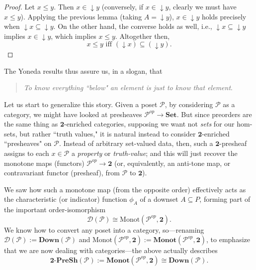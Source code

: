 \documentclass[a4paper]{book}
\theoremstyle{definition}
\theoremstyle{definition}
\theoremstyle{definition}
\theoremstyle{theorem}
\theoremstyle{definition}
\begin{document}
\begin{proof}
	Let $x \leq y$. Then $x \in \downarrow y$ (conversely, if $x \in \downarrow y$, clearly we must have $x \leq y$). Applying the previous lemma (taking $A = \downarrow y$), $x \in \downarrow y$ holds precisely when $\downarrow x \subseteq  \downarrow y$. On the other hand, the converse holds as well, i.e., $\downarrow x \subseteq  \downarrow y$ implies $x \in \downarrow y$, which implies $x \leq y$. Altogether then, 
	\begin{equation}
	x \leq y \text{ iff } (\downarrow x) \subseteq  (\downarrow y ). 
	\end{equation}
\end{proof} \noindent 
The Yoneda results thus assure us, in a slogan, that 
\begin{quote}
	\textit{To know everything ``below" an element is just to know that element}. 
\end{quote}
Let us start to generalize this story. Given a poset $\mathcal{P}$, by considering $\mathcal{P}$ as a category, we might have looked at presheaves $\mathcal{P}^{op} \rightarrow \textbf{Set}$. But since preorders are the same thing as $\textbf{2}$-enriched categories, supposing we want not \textit{sets} for our hom-sets, but rather ``truth values," it is natural instead to consider $\textbf{2}$-enriched ``presheaves" on $\mathcal{P}$. Instead of arbitrary set-valued data, then, such a $\textbf{2}$-presheaf assigns to each $x \in \mathcal{P}$ a \textit{property} or \textit{truth-value}; and this will just recover the monotone maps (functors) $\mathcal{P}^{op} \rightarrow \textbf{2}$ (or, equivalently, an anti-tone map, or contravariant functor (presheaf), from $\mathcal{P}$ to $\textbf{2}$). \par 
We saw how such a monotone map (from the opposite order) effectively acts as the characteristic (or indicator) function $\phi_A$ of a downset $A \subseteq  P$, forming part of the important order-isomorphism 
\begin{equation*}
\mathcal{D}(\mathcal{P}) \cong \text{Monot}(\mathcal{P}^{op}, \textbf{2}). 
\end{equation*}   
We know how to convert any poset into a category, so---renaming $\mathcal{D}(\mathcal{P}) := \textbf{Down}(\mathcal{P})$ and $\text{Monot}(\mathcal{P}^{op}, \textbf{2}) := \textbf{Monot}(\mathcal{P}^{op}, \textbf{2})$, to emphasize that we are now dealing with categories---the above actually describes
\begin{equation*}
\textbf{2-PreSh}(\mathcal{P}) := \textbf{Monot}(\mathcal{P}^{op}, \textbf{2}) \cong \textbf{Down}(\mathcal{P}).
\end{equation*}  
\end{document}
